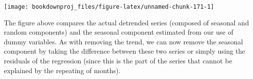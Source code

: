 \documentclass[
]{book}
\newenvironment{Shaded}{\begin{snugshade}}{\end{snugshade}}
\newcommand{\AttributeTok}[1]{\textcolor[rgb]{0.77,0.63,0.00}{#1}}
\newcommand{\ConstantTok}[1]{\textcolor[rgb]{0.00,0.00,0.00}{#1}}
\newcommand{\DecValTok}[1]{\textcolor[rgb]{0.00,0.00,0.81}{#1}}
\newcommand{\FunctionTok}[1]{\textcolor[rgb]{0.00,0.00,0.00}{#1}}
\newcommand{\NormalTok}[1]{#1}
\newcommand{\OtherTok}[1]{\textcolor[rgb]{0.56,0.35,0.01}{#1}}
\newcommand{\SpecialCharTok}[1]{\textcolor[rgb]{0.00,0.00,0.00}{#1}}
\newcommand{\StringTok}[1]{\textcolor[rgb]{0.31,0.60,0.02}{#1}}
\begin{document}
\begin{Shaded}
\end{Shaded}

\begin{center}\texttt{[image: bookdownproj\_files/figure-latex/unnamed-chunk-171-1]} \end{center}

The figure above compares the actual detrended series (composed of seasonal and random components) and the seasonal component estimated from our use of dummy variables. As with removing the trend, we can now remove the seasonal component by taking the difference between these two series or simply using the residuals of the regression (since this is the part of the series that cannot be explained by the repeating of months).
\end{document}
